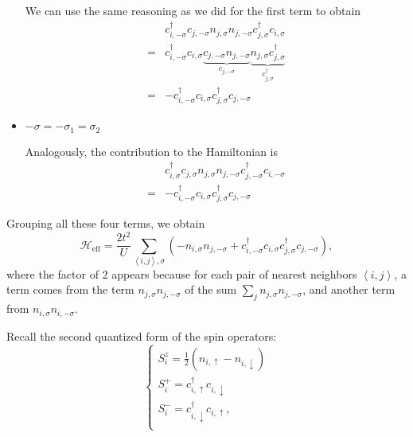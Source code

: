 \begin{itemize}
We can use the same reasoning as we did for the first term to obtain
\begin{equation*}
\begin{split}
&c_{i,-\sigma}^\dagger c_{j,-\sigma} n_{j,\sigma} n_{j, -\sigma} c_{j, \sigma}^\dagger c_{i, \sigma} \\
=& c_{i, -\sigma}^\dagger c_{i,\sigma} \underbrace{c_{j,-\sigma} n_{j, -\sigma}}_{c_{j,-\sigma}} \underbrace{n_{j, \sigma} c_{j, \sigma}^\dagger}_{c_{j,\sigma}^\dagger} \\
=& - c_{i, -\sigma}^\dagger c_{i,\sigma} c_{j, \sigma}^\dagger c_{j,-\sigma}
\end{split}
\end{equation*}

\item $-\sigma = - \sigma_1 = \sigma_2$

Analogously, the contribution to the Hamiltonian is
\begin{equation*}
\begin{split}
&c_{i,\sigma}^\dagger c_{j,\sigma} n_{j,\sigma} n_{j, -\sigma} c_{j, -\sigma}^\dagger c_{i, -\sigma} \\
=& - c_{i, -\sigma}^\dagger c_{i,\sigma} c_{j, \sigma}^\dagger c_{j,-\sigma}
\end{split}
\end{equation*}

\end{itemize}

Grouping all these four terms, we obtain
\begin{equation}
\mathcal{H}_{\text{eff}} = \frac{2t^2}{U} \sum_{\left\langle i, j \right\rangle, \sigma} ( - n_{i,\sigma} n_{j,-\sigma} + c_{i,-\sigma}^\dagger c_{i,\sigma} c_{j,\sigma}^\dagger c_{j,-\sigma} ) ,
\end{equation}
where the factor of 2 appears because for each pair of nearest neighbors $\left\langle i, j \right\rangle$, a term comes from the term $n_{j,\sigma} n_{j,-\sigma}$ of the sum $\sum_j n_{j,\sigma} n_{j,-\sigma}$, and another term from $n_{i,\sigma} n_{i,-\sigma}$.

Recall the second quantized form of the spin operators:
\begin{equation}
\begin{cases}
S_i^z = \frac{1}{2} ( n_{i,\uparrow} - n_{i,\downarrow} ) \\
S_i^+ = c_{i,\uparrow}^\dagger c_{i,\downarrow} \\
S_i^- = c_{i,\downarrow}^\dagger c_{i,\uparrow}, \\
\end{cases}
\end{equation}

